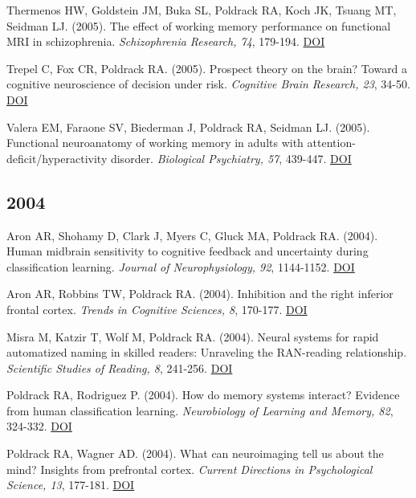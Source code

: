 \documentclass[10pt, letterpaper]{article}
\begin{document}
Thermenos HW, Goldstein JM, Buka SL, Poldrack RA, Koch JK, Tsuang MT, Seidman LJ.  (2005). The effect of working memory performance on functional MRI in schizophrenia. \textit{Schizophrenia Research, 74}, 179-194. \href{https://doi.org/10.1016/j.schres.2004.07.021}{DOI} \vspace{2mm}

Trepel C, Fox CR, Poldrack RA.  (2005). Prospect theory on the brain? Toward a cognitive neuroscience of decision under risk. \textit{Cognitive Brain Research, 23}, 34-50. \href{https://doi.org/10.1016/j.cogbrainres.2005.01.016}{DOI} \vspace{2mm}

Valera EM, Faraone SV, Biederman J, Poldrack RA, Seidman LJ.  (2005). Functional neuroanatomy of working memory in adults with attention-deficit/hyperactivity disorder. \textit{Biological Psychiatry, 57}, 439-447. \href{https://doi.org/10.1016/j.biopsych.2004.11.034}{DOI} \vspace{2mm}

\subsection*{2004}Aron AR, Shohamy D, Clark J, Myers C, Gluck MA, Poldrack RA.  (2004). Human midbrain sensitivity to cognitive feedback and uncertainty during classification learning. \textit{Journal of Neurophysiology, 92}, 1144-1152. \href{https://doi.org/10.1152/jn.01209.2003}{DOI} \vspace{2mm}

Aron AR, Robbins TW, Poldrack RA.  (2004). Inhibition and the right inferior frontal cortex. \textit{Trends in Cognitive Sciences, 8}, 170-177. \href{https://doi.org/10.1016/j.tics.2004.02.010}{DOI} \vspace{2mm}

Misra M, Katzir T, Wolf M, Poldrack RA.  (2004). Neural systems for rapid automatized naming in skilled readers: Unraveling the RAN-reading relationship. \textit{Scientific Studies of Reading, 8}, 241-256. \href{https://doi.org/10.1207/s1532799xssr0803_4}{DOI} \vspace{2mm}

Poldrack RA, Rodriguez P.  (2004). How do memory systems interact? Evidence from human classification learning. \textit{Neurobiology of Learning and Memory, 82}, 324-332. \href{https://doi.org/10.1016/j.nlm.2004.05.003}{DOI} \vspace{2mm}

Poldrack RA, Wagner AD.  (2004). What can neuroimaging tell us about the mind? Insights from prefrontal cortex. \textit{Current Directions in Psychological Science, 13}, 177-181. \href{https://doi.org/10.1111/j.0963-7214.2004.00302.x}{DOI} \vspace{2mm}
\end{document}
